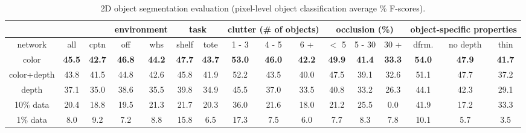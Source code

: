 \documentclass[letterpaper, 10 pt, conference]{ieeeconf}  %
\begin{document}
\begin{table*}[t]
\vspace{2mm}
  \centering
  \caption{2D object segmentation evaluation (pixel-level object classification average \% F-scores).}
  \vspace{-2mm}
  \begin{tabular}{c|c|c|c|c|c|c|c|c|c|c|c|c|c|c|c}
    \hline
    \multicolumn{3}{c}{ } & \multicolumn{2}{|c}{environment} & \multicolumn{2}{|c}{task} & \multicolumn{3}{|c}{clutter (\# of objects)} & \multicolumn{3}{|c}{occlusion (\%)} & \multicolumn{3}{|c}{object-specific properties} \\\hline
    network & all & cptn & off & whs & shelf & tote & 1 - 3 & 4 - 5 & 6 + & $<$ 5 & 5 - 30 & 30 + & dfrm. & no depth & thin \\\hline
    color & \bf 45.5 & \bf 42.7 & \bf 46.8 & \bf 44.2 & \bf 47.7 & \bf 43.7 & \bf 53.0 & \bf 46.0 & \bf 42.2 & \bf 49.9 & \bf 41.4 & \bf 33.3 & \bf 54.0 & \bf 47.9 & \bf 41.7 \\ 
    color+depth & 43.8 & 41.5 & 44.8 & 42.6 & 45.8 & 41.9 & 52.2 & 43.5 & 40.0 & 47.5 & 39.1 & 32.6 & 51.1 & 47.7 & 37.2 \\
    depth & 37.1 & 35.0 & 38.6 & 35.5 & 39.8 & 34.9 & 45.5 & 37.0 & 33.5 & 40.8 & 33.2 & 26.3 & 44.1 & 42.3 & 29.1\\\hline
    10\% data & 20.4 & 18.8 & 19.5 & 21.3 & 21.7 & 20.3 & 36.0 & 21.6 & 18.0 & 21.2 & 25.5 & 0.0 & 41.9 & 17.2 & 33.3\\
    1\% data & 8.0 & 9.2 & 7.2 & 8.8 & 15.8 & 6.5 & 17.3 & 7.5 & 6.0 & 7.7 & 8.3 & 7.8 & 10.1 & 5.7 & 3.5\\\hline
  \end{tabular}
  \label{table:seg}
\end{table*}
\end{document}
